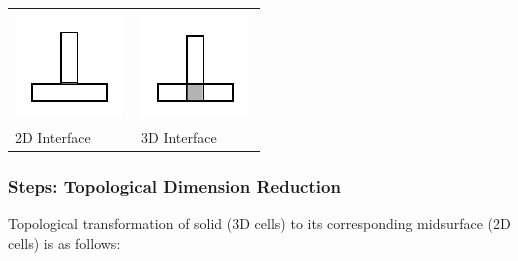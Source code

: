 \begin{tabular}[htp]{@{}p{0.48\linewidth} p{0.48\linewidth}@{}} 
\includegraphics[width=0.6\linewidth]{../Common/images/Interface2d.pdf} 
\label{fig_interfaces} &
\includegraphics[width=0.6\linewidth]{../Common/images/Interface3d.pdf} \\
2D Interface & 3D Interface\\
\end{tabular}



\subsubsection{Steps: Topological Dimension Reduction}
Topological transformation of solid (3D cells) to its corresponding midsurface (2D cells) is as follows:

